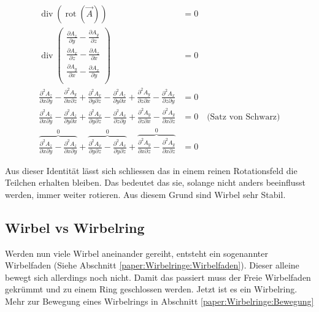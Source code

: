 \begin{align}
\operatorname{div} \left( \operatorname{rot} \left( \vec{A} \right) \right) 
&= 0\\
\operatorname{div}      
    \begin{pmatrix} 
        \frac{\partial A_z}{\partial y} - \frac{\partial A_y}{\partial z} \\ 
        \frac{\partial A_x}{\partial z} - \frac{\partial A_z}{\partial x} \\ 
        \frac{\partial A_y}{\partial x} - \frac{\partial A_x}{\partial y} \\ 
    \end{pmatrix} 
&= 0\\
\frac{\partial^2 A_z}{\partial x \partial y} - \frac{\partial^2 A_y}{\partial x \partial z} + 
\frac{\partial^2 A_x}{\partial y \partial z} - \frac{\partial^2 A_z}{\partial y \partial x} +
\frac{\partial^2 A_y}{\partial z \partial x} - \frac{\partial^2 A_x}{\partial z \partial y}
&= 0\\
\frac{\partial^2 A_z}{\partial x \partial y} - \frac{\partial^2 A_z}{\partial y \partial x} + 
\frac{\partial^2 A_x}{\partial y \partial z} - \frac{\partial^2 A_x}{\partial z \partial y} +
\frac{\partial^2 A_y}{\partial z \partial x} - \frac{\partial^2 A_y}{\partial x \partial z}
&= 0 \quad \text{(Satz von Schwarz)}\\
\overbrace{\frac{\partial^2 A_z}{\partial x \partial y} - \frac{\partial^2 A_z}{\partial x \partial y}}^0 + 
\overbrace{\frac{\partial^2 A_x}{\partial y \partial z} - \frac{\partial^2 A_x}{\partial y \partial z}}^0 +
\overbrace{\frac{\partial^2 A_y}{\partial x \partial z} - \frac{\partial^2 A_y}{\partial x \partial z}}^0
&= 0 
\end{align}

Aus dieser Identität lässt sich schliessen das in einem reinen Rotationsfeld die Teilchen erhalten bleiben. 
Das bedeutet das sie, solange nicht anders beeinflusst werden, immer weiter rotieren. 
Aus diesem Grund sind Wirbel sehr Stabil.


\subsection{Wirbel vs Wirbelring}

Werden nun viele Wirbel aneinander gereiht, entsteht ein sogenannter Wirbelfaden (Siehe Abschnitt \ref{paper:Wirbelringe:Wirbelfaden}).
Dieser alleine bewegt sich allerdings noch nicht. 
Damit das passiert muss der Freie Wirbelfaden gekrümmt und zu einem Ring geschlossen werden. 
Jetzt ist es ein Wirbelring. 
Mehr zur Bewegung eines Wirbelrings in Abschnitt \ref{paper:Wirbelringe:Bewegung}

